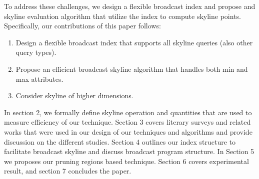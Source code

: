 \documentclass{sig-alternate}
\begin{document}


To address these challenges, we design a flexible broadcast index and
propose and skyline evaluation algorithm that utilize the index to 
compute skyline points. Specifically, our contributions of this paper
follows:

\begin{enumerate}
\item Design a flexible broadcast index that supports all skyline queries
(also other query types).
\item Propose an efficient broadcast skyline algorithm that handles both
min and max attributes.
\item Consider skyline of higher dimensions.
\end{enumerate}

In section 2, we formally define skyline operation and quantities that are
used to measure efficiency of our technique.
Section 3 covers literary surveys and related works that were used in our
design of our techniques and algorithms and provide discussion on the
different studies.
Section 4 outlines our index structure to facilitate broadcast skyline and
discuss broadcast program structure.
In Section 5 we proposes our pruning regions based technique.
Section 6 covers
experimental result,
and section 7 concludes the paper.

\end{document}
